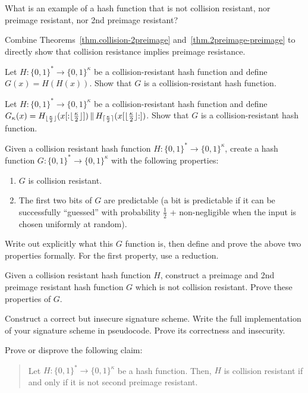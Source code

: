 \begin{problems}
  \item What is an example of a hash function that is not collision resistant, nor preimage resistant, nor
        2nd preimage resistant?
  \item Combine Theorems~\ref{thm.collision-2preimage} and~\ref{thm.2preimage-preimage} to
        directly show that collision resistance implies preimage resistance.
  \item Let $H:\{0,1\}^* \to \{0,1\}^{\kappa}$ be a collision-resistant hash
        function and define $G(x) = H(H(x))$. Show that $G$ is a
        collision-resistant hash function.
  \item Let $H:\{0,1\}^* \to \{0,1\}^{\kappa}$ be a collision-resistant hash
        function and define $G_\kappa(x) = H_{\lfloor\frac{\kappa}{2}\rfloor}(x[{:}{\lfloor\frac{\kappa}{2}\rfloor}]) \,\|\, H_{\lceil\frac{\kappa}{2}\rceil}(x[{\lfloor\frac{\kappa}{2}\rfloor}{:}])$. Show that $G$ is a
        collision-resistant hash function.
  \item Given a collision resistant hash function
        $H: \{0, 1\}^* \longrightarrow \{0, 1\}^\kappa$, create a hash function
        $G: \{0, 1\}^* \longrightarrow \{0, 1\}^\kappa$ with the following
        properties:
        \begin{enumerate}
          \item $G$ is collision resistant.
          \item The first two bits of $G$ are predictable (a bit is predictable
                if it can be successfully ``guessed'' with probability
                $\frac{1}{2}$ + non-negligible when the input is chosen
                uniformly at random).
        \end{enumerate}
        Write out explicitly what this $G$ function is, then define and prove
        the above two properties formally. For the first property, use a
        reduction.
  \item Given a collision resistant hash function $H$, construct a preimage and
        2nd preimage resistant hash function $G$ which is not collision
        resistant. Prove these properties of $G$.
  \item Construct a correct but insecure signature scheme. Write the full
        implementation of your signature scheme in pseudocode. Prove its
        correctness and insecurity.
  \item Prove or disprove the following claim:
        \begin{quote}
          Let $H: \{0, 1\}^* \longrightarrow \{0, 1\}^\kappa$ be a hash
          function. Then, $H$ is collision resistant if and only if it is not
          second preimage resistant.
        \end{quote}
\end{problems}

